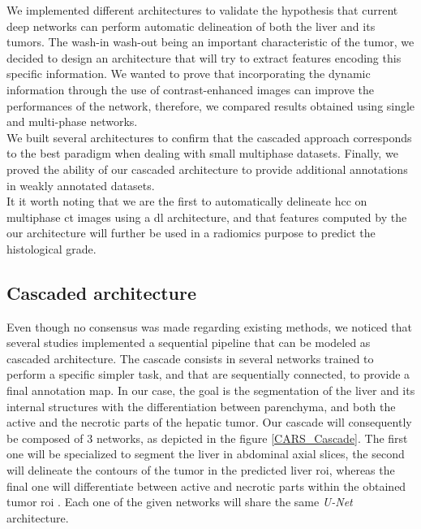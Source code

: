 We implemented different architectures to validate the hypothesis that
current deep networks can perform automatic delineation of both the
liver and its tumors. 
The wash-in wash-out being an important characteristic of the tumor, we decided to design an architecture that will try to extract features encoding this specific information. We wanted to prove that incorporating the dynamic information through the use of contrast-enhanced images can improve the performances of the network, therefore, we compared results obtained using single and multi-phase networks. \\
We built several architectures to confirm that the cascaded approach corresponds to the best paradigm when dealing with small multiphase datasets.
Finally, we proved the ability of our cascaded architecture to provide additional annotations in weakly annotated datasets.\\
It it worth noting that we are the first to automatically 
delineate \ac{hcc} on multiphase \ac{ct} images using a \ac{dl} architecture, and that features computed by the our architecture will further be used in a radiomics purpose to predict the histological grade.



\subsection{Cascaded architecture}

Even though no consensus was made regarding existing methods, we noticed that
several studies implemented a sequential pipeline that can be modeled as
cascaded architecture. The cascade consists in several networks trained
to perform a specific simpler task, and that are sequentially connected, to
provide a final annotation map. In our case, the goal is the
segmentation of the liver and its internal structures with the
differentiation between parenchyma, and both the active and the necrotic
parts of the hepatic tumor.
Our cascade will consequently be composed of 3 networks, as depicted
in the figure \ref{CARS_Cascade}. The first one will be specialized to segment the liver in
abdominal axial slices, the second will delineate the contours of the
tumor in the predicted liver \ac{roi}, whereas the final one will
differentiate between active and necrotic parts within the obtained
tumor \ac{roi} \cite{Ouhmich2019}.
Each one of the given networks will share the same \emph{U-Net}
architecture.

